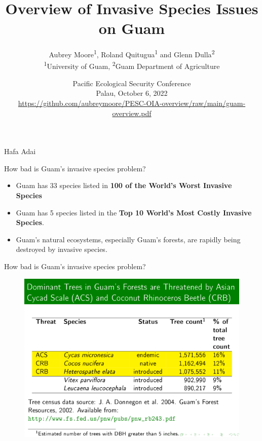 \documentclass[]{beamer}
\title[Invasive Species Issues on Guam]{Overview of Invasive Species Issues on Guam}
\author[]{
	Aubrey Moore\textsuperscript{1}, Roland Quitugua\textsuperscript{1} and Glenn Dulla\textsuperscript{2}\\
	\bigskip 
	\tiny{\textsuperscript{1}University of Guam, \textsuperscript{2}Guam Department of Agriculture}
}
\date[]{Pacific Ecological Security Conference\\Palau, October 6, 2022\\ \tiny\url{https://github.com/aubreymoore/PESC-OIA-overview/raw/main/guam-overview.pdf}}
\begin{document}
	
    \maketitle

\begin{frame}{Hafa Adai}
\end{frame}

\begin{frame}{How bad is Guam's invasive species problem?}
	\begin{itemize}
		\item Guam has 33 species listed in \textbf{100 of the World's Worst Invasive Species}
		\item Guam has 5 species listed in the \textbf{Top 10 World's Most Costly Invasive Species}.
		\item Guam's natural ecosystems, especially Guam's forests, are rapidly being destroyed by invasive species.
	\end{itemize}	
\end{frame}

\begin{frame}{How bad is Guam's invasive species problem?}
\begin{figure}
	\centering
	\includegraphics[width=1\linewidth]{images/dominant_trees}
	\caption{}
	\label{fig:dominanttrees}
\end{figure}
\end{frame}
\end{document}
